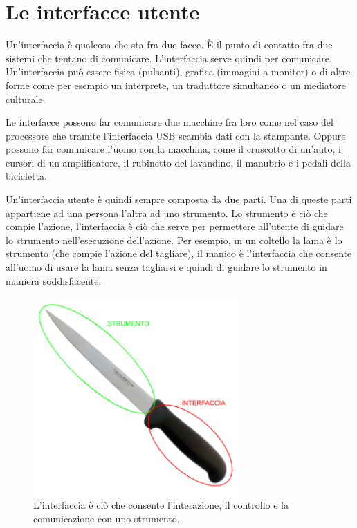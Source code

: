 \chapter{Le interfacce utente}

Un'interfaccia è qualcosa che sta fra due facce. È il punto di contatto fra due sistemi che tentano di comunicare. L'interfaccia serve quindi per comunicare. Un'interfaccia può essere fisica (pulsanti), grafica (immagini a monitor) o di altre forme come per esempio un interprete, un traduttore simultaneo o un mediatore culturale. 

Le interfacce possono far comunicare due macchine fra loro come nel caso del processore che tramite l'interfaccia USB scambia dati con la stampante. Oppure possono far comunicare l’uomo con la macchina, come il cruscotto di un’auto, i cursori di un amplificatore, il rubinetto del lavandino, il manubrio e i pedali della bicicletta.

Un'interfaccia utente è quindi sempre composta da due parti. Una di queste parti appartiene ad una persona l'altra ad uno strumento. Lo strumento è ciò che compie l'azione, l’interfaccia è ciò che serve per permettere all'utente di guidare lo strumento nell'esecuzione dell'azione. Per esempio, in un coltello la lama è lo strumento (che compie l'azione del tagliare), il manico è l’interfaccia che consente all'uomo di usare la lama senza tagliarsi e quindi di guidare lo strumento in maniera soddisfacente. 

\begin{figure}[!h]
	\centering
	\includegraphics[width=0.7\textwidth]{immagini/interfaccia.png}
	\caption{L'interfaccia è ciò che consente l'interazione, il controllo e la comunicazione con uno strumento.}
\end{figure}


